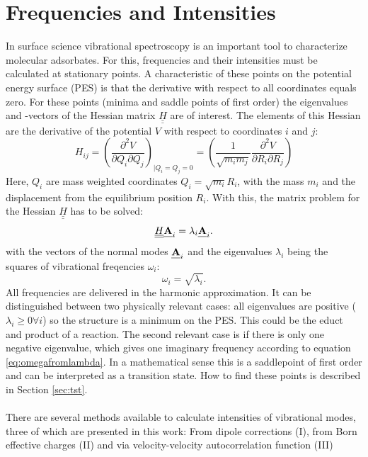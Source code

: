 \documentclass[11pt,DIV=13,BCOR=5mm,a4paper,headinclude]{scrbook}
\def\mathbi#1{\textbf{\em #1}}
\renewcommand{\vec}[1]{\mathbi{#1}}
\def\doubleunderline#1{\underline{\underline{#1}}}
\begin{document}
\section{Frequencies and Intensities}
In surface science vibrational spectroscopy is an important tool to characterize molecular adsorbates.
For this, frequencies and their intensities must be calculated at stationary points.
A characteristic of these points on the potential energy surface (PES) is that the derivative with respect to all coordinates equals zero.
For these points (minima and saddle points of first order) the eigenvalues and -vectors of the Hessian matrix $\doubleunderline{H}$ are of interest.
The elements of this Hessian are the derivative of the potential $V$ with respect to coordinates $i$ and $j$:
\begin{equation}
 H_{ij}=\left( \frac{\partial^2 V}{\partial Q_i \partial Q_j} \right)_{|Q_i=Q_j=0}=\left(\frac{1}{\sqrt{m_i m_j}} \frac{\partial^2 V}{\partial R_i \partial R_j} \right)
\end{equation}
Here, $Q_i$ are mass weighted coordinates $Q_i=\sqrt{m_i}R_i$, with the mass $m_i$ and the displacement from the equilibrium position $R_i$.
With this, the matrix problem for the Hessian $\doubleunderline{H}$ has to be solved:
\begin{equation}
 \doubleunderline{H} \vec{A}_i=\lambda_i\vec{A}_i.
\end{equation}
with the vectors of the normal modes $\vec{A}_i$ and the eigenvalues $\lambda_i$ being the squares of vibrational freqencies $\omega_i$: 
\begin{equation}\label{eq:omegafromlambda}
 \omega_i=\sqrt{\lambda_i}.
\end{equation}
All frequencies are delivered in the harmonic approximation.
It can be distinguished between two physically relevant cases: all eigenvalues are positive ($\lambda_i\geq 0 \forall i$) so the structure is a minimum on the PES.
This could be the educt and product of a reaction.
The second relevant case is if there is only one negative eigenvalue, which gives one imaginary frequency according to equation \ref{eq:omegafromlambda}.
In a mathematical sense this is a saddlepoint of first order and can be interpreted as a transition state.
How to find these points is described in Section \ref{sec:tst}.
\\\\
There are several methods available to calculate intensities of vibrational modes, three of which are presented in this work: From dipole corrections (I), from Born effective charges (II) and via velocity-velocity autocorrelation function (III)
\end{document}
